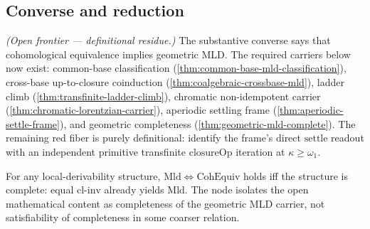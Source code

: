 \subsection{Converse and reduction}

\begin{theorem}\label{thm:aperiodic-mld-classification}\notready{}
\emph{(Open frontier --- definitional residue.)} The substantive converse says
that cohomological equivalence implies geometric MLD.  The required carriers
below now exist: common-base classification
(\cref{thm:common-base-mld-classification}), cross-base up-to-closure
coinduction (\cref{thm:coalgebraic-crossbase-mld}), ladder climb
(\cref{thm:transfinite-ladder-climb}), chromatic non-idempotent carrier
(\cref{thm:chromatic-lorentzian-carrier}), aperiodic settling frame
(\cref{thm:aperiodic-settle-frame}), and geometric completeness
(\cref{thm:geometric-mld-complete}).  The remaining red fiber is purely
definitional: identify the frame's direct \(\mathrm{settle}\) readout with an
independent primitive transfinite \(\mathrm{closureOp}\) iteration at
\(\kappa\ge\omega_1\).
\end{theorem}

\begin{theorem}\label{thm:aperiodic-mld-classification-reduction}\leanok{}
For any local-derivability structure, \(\mathrm{Mld}\iff\mathrm{CohEquiv}\)
holds iff the structure is complete: equal \(\mathrm{cl\text{-}inv}\) already
yields \(\mathrm{Mld}\).  The node isolates the open mathematical content as
completeness of the geometric MLD carrier, not satisfiability of completeness in
some coarser relation.
\end{theorem}
